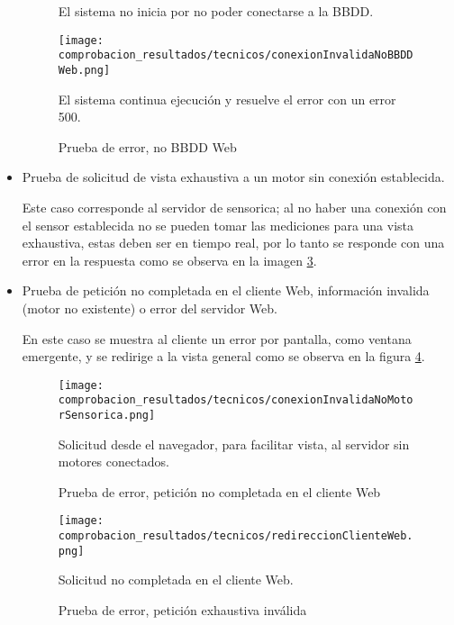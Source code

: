 \begin{itemize}
\begin{figure}[H]
            El sistema no inicia por no poder conectarse a la BBDD.
            \label{img:NoBBDDSensorica}
        \end{figure}

        \begin{figure}[H]
            \centering
            \caption{Prueba de error, no BBDD Web}
            \texttt{[image: comprobacion\_resultados/tecnicos/conexionInvalidaNoBBDDWeb.png]}

            El sistema continua ejecución y resuelve el error con un error 500.
            \label{img:NoBBDDWeb}
        \end{figure}
    \item Prueba de solicitud de vista exhaustiva a un motor sin conexión
        establecida.

        Este caso corresponde al servidor de sensorica; al no haber una conexión
        con el sensor establecida no se pueden tomar las mediciones para una vista
        exhaustiva, estas deben ser en tiempo real, por lo tanto se responde
        con una error en la respuesta como se observa en la imagen \ref{img:ErrorExhaustiva}.

    \item Prueba de petición no completada en el cliente Web,
        información invalida (motor no existente) o error del servidor Web.

        En este caso se muestra al cliente un error por pantalla, como ventana
        emergente, y se redirige a la vista general como se observa en la
        figura \ref{img:SolicitudNoCompletada}.

        \begin{figure}[H]
            \centering
            \caption{Prueba de error, petición no completada en el cliente Web}
            \texttt{[image: comprobacion\_resultados/tecnicos/conexionInvalidaNoMotorSensorica.png]}

            Solicitud  desde el navegador, para facilitar vista, al servidor
            sin motores conectados.
            \label{img:ErrorExhaustiva}
        \end{figure}

        \begin{figure}[H]
            \centering
            \caption{Prueba de error, petición exhaustiva inválida}
            \texttt{[image: comprobacion\_resultados/tecnicos/redireccionClienteWeb.png]}

            Solicitud no completada en el cliente Web. \label{img:SolicitudNoCompletada}
        \end{figure}
\end{itemize}

